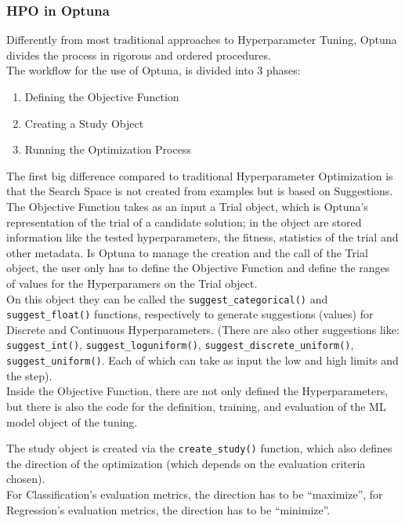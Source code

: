 \subsubsection{HPO in Optuna}

Differently from most traditional approaches to Hyperparameter Tuning, Optuna divides the process in rigorous and ordered procedures.
% 
\\[0.3cm]The workflow for the use of Optuna, is divided into 3 phases:
\begin{enumerate}[itemsep=0.1cm]
	\item Defining the Objective Function
	\item Creating a Study Object
	\item Running the Optimization Process
\end{enumerate}

The first big difference compared to traditional Hyperparameter Optimization is that the Search Space is not created from examples but is based on Suggestions.
\\[0.3cm]The Objective Function takes as an input a Trial object, which is Optuna's representation of the trial of a candidate solution; in the object are stored information like the tested hyperparameters, the fitness, statistics of the trial and other metadata. Is Optuna to manage the creation and the call of the Trial object, the user only has to define the Objective Function and define the ranges of values for the Hyperparamers on the Trial object.
\\[0.3cm]On this object they can be called the \texttt{suggest\_categorical()} and \texttt{suggest\_float()} functions, respectively to generate suggestions (values) for Discrete and Continuous Hyperparameters.
(There are also other suggestions like: \texttt{suggest\_int()}, \newline\texttt{suggest\_loguniform()}, \texttt{suggest\_discrete\_uniform()}, \texttt{suggest\_uniform()}. Each of which can take as input the low and high limits and the step).
\\[0.3cm]Inside the Objective Function, there are not only defined the Hyperparameters, but there is also the code for the definition, training, and evaluation of the ML model object of the tuning.

The study object is created via the \texttt{create\_study()} function, which also defines the direction of the optimization (which depends on the evaluation criteria chosen).
\\[0.3cm]For Classification's evaluation metrics, the direction has to be “maximize”, for Regression's evaluation metrics, the direction has to be “minimize”.

